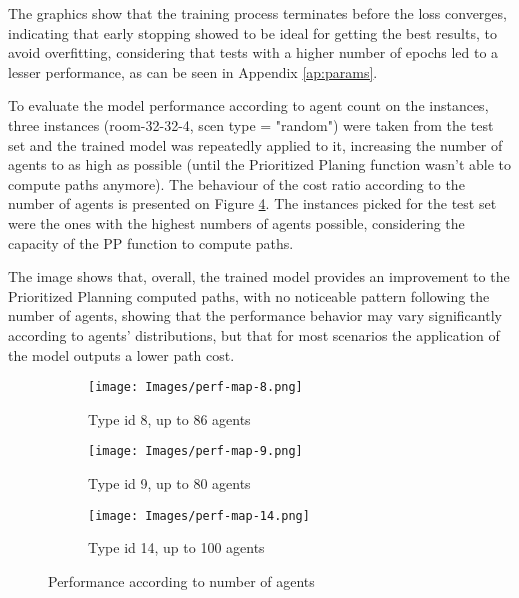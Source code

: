 The graphics show that the training process terminates before the loss converges, indicating that early stopping showed to be ideal for getting the best results, to avoid overfitting, considering that tests with a higher number of epochs led to a lesser performance, as can be seen in Appendix \ref{ap:params}.

To evaluate the model performance according to agent count on the instances, three instances (room-32-32-4, scen type = "random") were taken from the test set and the trained model was repeatedly applied to it, increasing the number of agents to as high as possible (until the Prioritized Planing function wasn't able to compute paths anymore). The behaviour of the cost ratio according to the number of agents is presented on Figure \ref{fig:ratio-agents}. The instances picked for the test set were the ones with the highest numbers of agents possible, considering the capacity of the PP function to compute paths.

The image shows that, overall, the trained model provides an improvement to the Prioritized Planning computed paths, with no noticeable pattern following the number of agents, showing that the performance behavior may vary significantly according to agents' distributions, but that for most scenarios the application of the model outputs a lower path cost.

\begin{figure}[!ht]
    \centering
    \begin{subfigure}[b]{0.45\textwidth}
        \texttt{[image: Images/perf-map-8.png]}
        \caption{Type id 8, up to 86 agents}
        \label{fig:8-86}
    \end{subfigure}
    \hspace{0.01\textwidth}
    \begin{subfigure}[b]{0.45\textwidth}
        \texttt{[image: Images/perf-map-9.png]}
        \caption{Type id 9, up to 80 agents}
        \label{fig:9-80}
    \end{subfigure}
    \hspace{0.01\textwidth}
    \begin{subfigure}[b]{0.45\textwidth}
        \texttt{[image: Images/perf-map-14.png]}
        \caption{Type id 14, up to 100 agents}
        \label{fig:14-100}
    \end{subfigure}
    
    \caption{Performance according to number of agents}
    \label{fig:ratio-agents}
\end{figure}

